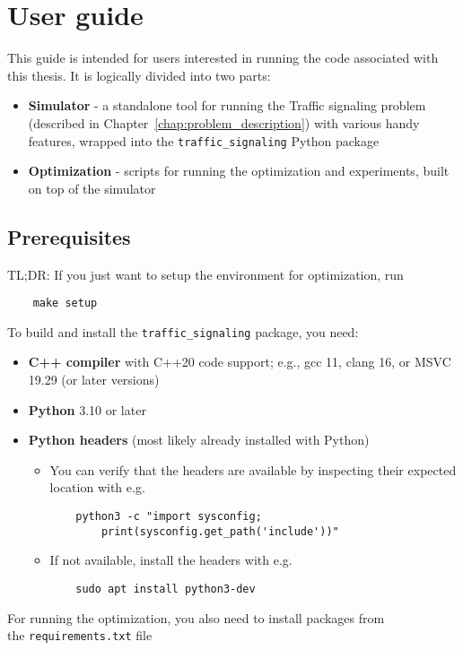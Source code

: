 \chapter{User guide} \label{chap:user_guide}

This guide is intended for users interested in running the code associated with this thesis. It is logically divided into two parts:
\begin{itemize}
    \item \textbf{Simulator} - a standalone tool for running the Traffic signaling problem (described in Chapter~\ref{chap:problem_description}) with various handy features, wrapped into the \verb|traffic_signaling| Python package 
    \item \textbf{Optimization} - scripts for running the optimization and experiments, built on top of the simulator
\end{itemize}

\section{Prerequisites}

TL;DR: If you just want to setup the environment for optimization, run
\begin{verbatim}
    make setup
\end{verbatim}

To build and install the \verb|traffic_signaling| package, you need:
\begin{itemize}
    \item \textbf{C++ compiler} with C++20 code support; e.g., gcc 11, clang 16, or MSVC 19.29 (or later versions)
    \item \textbf{Python} 3.10 or later
    \item \textbf{Python headers} (most likely already installed with Python)
    \begin{itemize}
        \item You can verify that the headers are available by inspecting their expected location with e.g.
\begin{verbatim}
    python3 -c "import sysconfig;
        print(sysconfig.get_path('include'))"
\end{verbatim}
        \item If not available, install the headers with e.g.
\begin{verbatim}
    sudo apt install python3-dev
\end{verbatim}
    \end{itemize}
\end{itemize}
For running the optimization, you also need to install packages from \\
the \verb|requirements.txt| file
